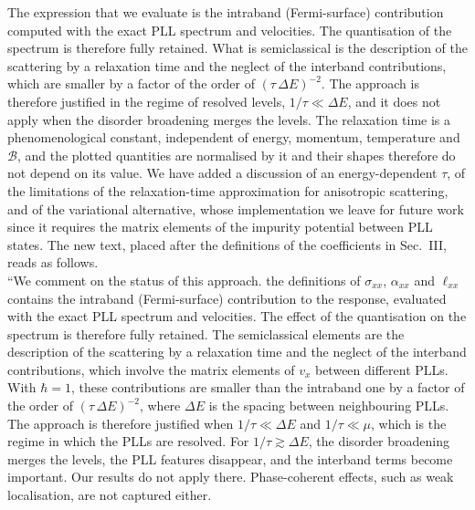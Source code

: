 \documentclass[aps,prb,onecolumn,nofootinbib,citeautoscript,10pt]{revtex4-2}
\begin{document}
\begin{enumerate}
The expression that we evaluate is the intraband (Fermi-surface) contribution computed with the exact PLL spectrum and velocities. The quantisation of the spectrum is therefore fully retained. What is semiclassical is the description of the scattering by a relaxation time and the neglect of the interband contributions, which are smaller by a factor of the order of $(\tau\,\Delta E)^{-2}$. The approach is therefore justified in the regime of resolved levels, $1/\tau\ll\Delta E$, and it does not apply when the disorder broadening merges the levels. The relaxation time is a phenomenological constant, independent of energy, momentum, temperature and $\mathcal B$, and the plotted quantities are normalised by it and their shapes therefore do not depend on its value. We have added a discussion of an energy-dependent $\tau$, of the limitations of the relaxation-time approximation for anisotropic scattering, and of the variational alternative, whose implementation we leave for future work since it requires the matrix elements of the impurity potential between PLL states. The new text, placed after the definitions of the coefficients in Sec.~III, reads as follows.\\``We comment on the status of this approach. the definitions of $\sigma_{xx}$, $\alpha_{xx}$ and $\ell_{xx}$ contains the intraband (Fermi-surface) contribution to the response, evaluated with the exact PLL spectrum and velocities. The effect of the quantisation on the spectrum is therefore fully retained. The semiclassical elements are the description of the scattering by a relaxation time and the neglect of the interband contributions, which involve the matrix elements of $v_x$ between different PLLs. With $\hbar=1$, these contributions are smaller than the intraband one by a factor of the order of $(\tau\,\Delta E)^{-2}$, where $\Delta E$ is the spacing between neighbouring PLLs. The approach is therefore justified when $1/\tau\ll\Delta E$ and $1/\tau\ll\mu$, which is the regime in which the PLLs are resolved. For $1/\tau\gtrsim\Delta E$, the disorder broadening merges the levels, the PLL features disappear, and the interband terms become important. Our results do not apply there. Phase-coherent effects, such as weak localisation, are not captured either.


\end{enumerate}
\end{document}

